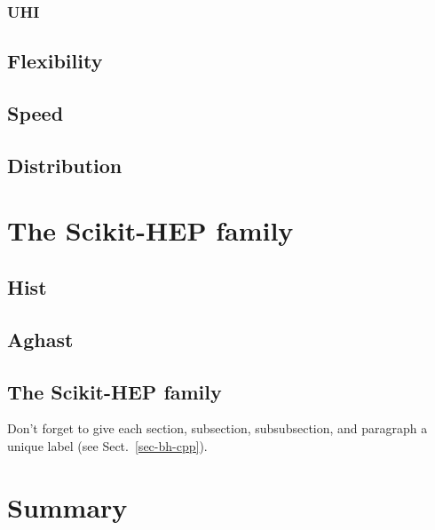 \documentclass{webofc}
\begin{document}
\subsubsection{UHI}
\label{sec-bhp-uhi}

\subsection{Flexibility}
\subsection{Speed}
\subsection{Distribution}

\section{The Scikit-HEP family}
\label{sec-3}

\subsection{Hist}
\subsection{Aghast}
\subsection{The Scikit-HEP family}

Don't forget to give each section, subsection, subsubsection, and
paragraph a unique label (see Sect.~\ref{sec-bh-cpp}).

\section{Summary}
\label{sec-4}

% 
\end{document}
